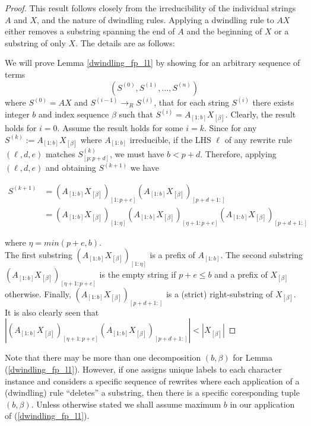 \documentclass{lmcs} %
\theoremstyle{plain}\newtheorem{satz}[thm]{Satz} %
\newcommand{\ssp}[1]{^{(#1)}}
\begin{document}
\begin{proof}
  This result follows closely from the irreducibility of the
individual strings $A$ and $X$, and the nature of dwindling
rules. Applying a dwindling rule to $AX$ either removes a substring
spanning the end of $A$ and the beginning of $X$ or a substring of
only $X$. The details are as follows:

We will prove Lemma \ref{dwindling_fp_l1} by showing for an
arbitrary sequence of terms $$(S\ssp{0},S\ssp{1},\dots,S\ssp{n})$$
where $S\ssp{0} = AX$ and $S\ssp{i-1} \rightarrow_R S\ssp{i}$, that for
each string $S\ssp{i}$ there exists integer $b$ and index sequence
$\beta$ such that $S^{(i)}=A_{[1:b]}X_{[\beta]}$. Clearly, the result
holds for $i=0$. Assume the result holds for some $i=k$. Since for any
$S^{(k)} := A_{[1:b]}X_{[\beta]}$ where $A_{[1:b]}$ irreducible, if
the LHS $\ell$ of any rewrite rule $(\ell,d,e)$ matches $S^{(k)}_{[p:p+d]}$,
we must have $b < p+d$. Therefore, applying $(\ell,d,e)$ and obtaining
$S^{(k+1)}$ we have


\begin{align} S^{(k+1)} &=
(A_{[1:b]}X_{[\beta]})_{[1:p+e]}(A_{[1:b]}X_{[\beta]})_{[p+d+1:]} \\ &=
(A_{[1:b]}X_{[\beta]})_{[1:\eta]}(A_{[1:b]}X_{[\beta]})_{[\eta+1:p+e]}(A_{[1:b]}X_{[\beta]})_{[p+d+1:]}
\end{align}

\noindent where $\eta=min(p+e,b)$. \\

The first substring $(A_{[1:b]}X_{[\beta]})_{[1:\eta]}$ is a prefix of
$A_{[1:b]}$. The second substring \\$(A_{[1:b]}X_{[\beta]})_{[\eta+1:p+e]}$ is
the empty string if $p+e \leq b$ and a prefix of $X_{[\beta]}$
otherwise. Finally, $(A_{[1:b]}X_{[\beta]})_{[p+d+1:]}$ is a (strict)
right-substring of $X_{[\beta]}$. It is also clearly seen that
$|(A_{[1:b]}X_{[\beta]})_{[\eta+1:p+e]}(A_{[1:b]}X_{[\beta]})_{[p+d+1:]}| <
|X_{[\beta]}|$ 
\end{proof}

Note that there may be more than one decomposition $(b,\beta)$ for
Lemma (\ref{dwindling_fp_l1}). However, if one assigns unique labels
to each character instance and considers a specific sequence of
rewrites where each application of a (dwindling) rule ``deletes'' a
substring, then there is a specific coresponding tuple
$(b,\beta)$. Unless otherwise stated we shall assume maximum $b$ in
our application of (\ref{dwindling_fp_l1}).
\end{document}
